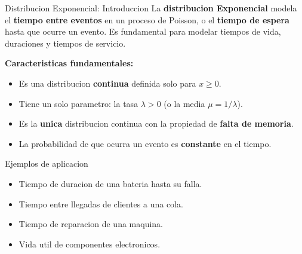 \documentclass[10pt]{beamer}
\begin{document}
\begin{frame}{Distribucion Exponencial: Introduccion}
\justifying
La \textbf{distribucion Exponencial} modela el \textbf{tiempo entre eventos} en un proceso de Poisson, o el \textbf{tiempo de espera} hasta que ocurre un evento. Es fundamental para modelar tiempos de vida, duraciones y tiempos de servicio.

\vspace{0.2cm}
\textbf{Caracteristicas fundamentales:}
\begin{itemize}
    \item Es una distribucion \textbf{continua} definida solo para $x \geq 0$.
    \item Tiene un solo parametro: la tasa $\lambda > 0$ (o la media $\mu = 1/\lambda$).
    \item Es la \textbf{unica} distribucion continua con la propiedad de \textbf{falta de memoria}.
    \item La probabilidad de que ocurra un evento es \textbf{constante} en el tiempo.
\end{itemize}

\vspace{0.2cm}
\begin{exampleblock}{Ejemplos de aplicacion}
\begin{itemize}
    \item Tiempo de duracion de una bateria hasta su falla.
    \item Tiempo entre llegadas de clientes a una cola.
    \item Tiempo de reparacion de una maquina.
    \item Vida util de componentes electronicos.
\end{itemize}
\end{exampleblock}
\end{frame}
\end{document}
